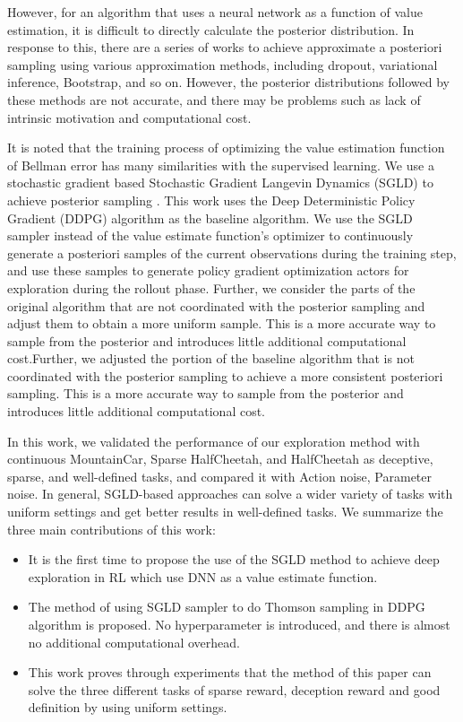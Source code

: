 However, for an algorithm that uses a neural network as a function of value estimation, it is difficult to directly calculate the posterior distribution. In response to this, there are a series of works to achieve approximate a posteriori sampling using various approximation methods, including dropout\cite{dropoutInference}, variational inference\cite{VIME}, Bootstrap\cite{BDQN}, and so on. However, the posterior distributions followed by these methods are not accurate, and there may be problems such as lack of intrinsic motivation and computational cost.\cite{osband2018randomized}

It is noted that the training process of optimizing the value estimation function of Bellman error has many similarities with the supervised learning. We use a stochastic gradient based Stochastic Gradient Langevin Dynamics (SGLD) to achieve posterior sampling \cite{SGLD}. This work uses the Deep Deterministic Policy Gradient (DDPG) algorithm as the baseline algorithm\cite{DDPG}. We use the SGLD sampler instead of the value estimate function's optimizer to continuously generate a posteriori samples of the current observations during the training step, and use these samples to generate policy gradient optimization actors for exploration during the rollout phase. Further, we consider the parts of the original algorithm that are not coordinated with the posterior sampling and adjust them to obtain a more uniform sample. This is a more accurate way to sample from the posterior and introduces little additional computational cost.Further, we adjusted the portion of the baseline algorithm that is not coordinated with the posterior sampling to achieve a more consistent posteriori sampling. This is a more accurate way to sample from the posterior and introduces little additional computational cost.

In this work, we validated the performance of our exploration method with continuous MountainCar, Sparse HalfCheetah, and HalfCheetah as deceptive, sparse, and well-defined tasks, and compared it with Action noise, Parameter noise. In general, SGLD-based approaches can solve a wider variety of tasks with uniform settings and get better results in well-defined tasks. We summarize the three main contributions of this work:
\begin{itemize}
\item  It is the first time to propose the use of the SGLD method to achieve deep exploration in RL which use DNN as a value estimate function.
\item  The method of using SGLD sampler to do Thomson sampling in DDPG algorithm is proposed. No hyperparameter is introduced, and there is almost no additional computational overhead.
\item This work proves through experiments that the method of this paper can solve the three different tasks of sparse reward, deception reward and good definition by using uniform settings.
\end{itemize} 

